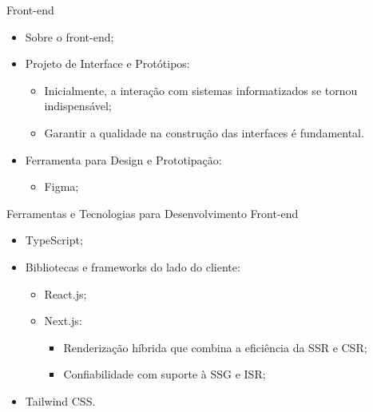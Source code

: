 \begin{frame}{Front-end}
    \begin{itemize}
        \item Sobre o front-end; \vspace{0.5cm}
        \item Projeto de Interface e Protótipos: \vspace{0.5cm}
              \begin{itemize}
                  \item Inicialmente, a interação com sistemas informatizados se tornou indispensável; \vspace{0.25cm}
                  \item Garantir a qualidade na construção das interfaces é fundamental. \vspace{0.25cm}
              \end{itemize}
        \item Ferramenta para Design e Prototipação: \vspace{0.5cm}
              \begin{itemize}
                  \item Figma; \vspace{0.25cm}
              \end{itemize}
    \end{itemize}
\end{frame}

\begin{frame}{Ferramentas e Tecnologias para Desenvolvimento Front-end}
    \begin{itemize}
        \item TypeScript; \vspace{0.5cm}
        \item Bibliotecas e frameworks do lado do cliente: \vspace{0.5cm}
        \begin{itemize}
            \item React.js; \vspace{0.25cm}
            \item Next.js: \vspace{0.25cm}
                \begin{itemize}
                    \item Renderização híbrida que combina a eficiência da SSR e CSR; \vspace{0.25cm}
                    \item Confiabilidade com suporte à SSG e ISR; \vspace{0.25cm}
                \end{itemize}
        \end{itemize}
        \item Tailwind CSS. \vspace{0.5cm}
    \end{itemize}
\end{frame}

